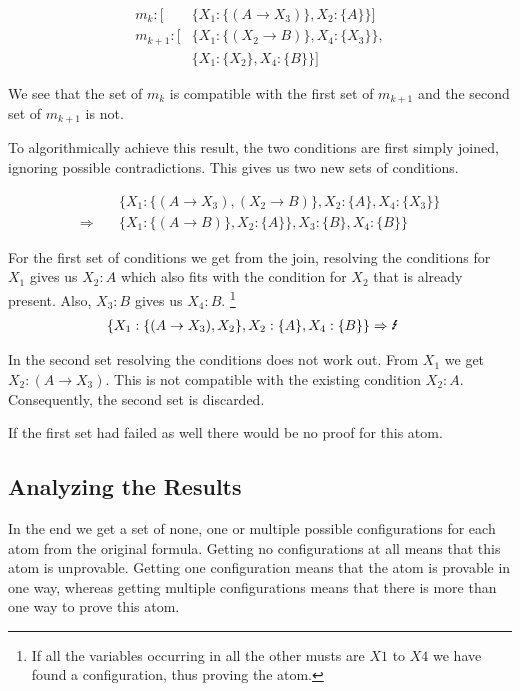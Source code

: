 \begin{align*}
	m_k: [	& \{X_1: \{(A \rightarrow X_3)\}, X_2: \{A\}\}]\\
	m_{k+1}: [	& \{X_1: \{(X_2 \rightarrow B)\}, X_4: \{X_3\}\},\\
			& \{X_1: \{X_2\}, X_4: \{B\}\}]
\end{align*}

We see that the set of $m_k$ is compatible with the first set of $m_{k+1}$ and the second set of $m_{k+1}$ is not.

To algorithmically achieve this result, the two conditions are first simply joined, ignoring possible contradictions. This gives us two new sets of conditions.

\begin{align*}
	& \{	X_1: \{(A \rightarrow X_3), (X_2 \rightarrow B)\},
						X_2: \{A\}, 
						X_4: \{X_3\}\}\\
					\Rightarrow \quad & \{X_1: \{(A \rightarrow B)\}, X_2: \{A\}\}, X_3: \{B\}, X_4: \{B\}\}
\end{align*}


For the first set of conditions we get from the join, resolving the conditions for $X_1$ gives us $X_2:A$ which also fits with the condition for $X_2$ that is already present. Also, $X_3: B$ gives us $X_4: B$. \footnote{If all the variables occurring in all the other musts are $X1$ to $X4$ we have found a configuration, thus proving the atom.}
\begin{align*}
	& \{X_1: \{(A \rightarrow X_3), X_2\},
						X_2: \{A\}, 
						X_4: \{B\}\} \Rightarrow \text{\Lightning} 
\end{align*}

In the second set resolving the conditions does not work out. From $X_1$ we get $X_2: (A \rightarrow X_3)$. This is not compatible with the existing condition $X_2: A$. Consequently, the second set is discarded. 

If the first set had failed as well there would be no proof for this atom.

\subsection{Analyzing the Results}
In the end we get a set of none, one or multiple possible configurations for each atom from the original formula. Getting no configurations at all means that this atom is unprovable. Getting one configuration means that the atom is provable in one way, whereas getting multiple configurations means that there is more than one way to prove this atom.

